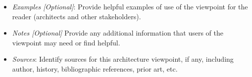 \begin{itemize}
\item {\em Examples [Optional]}: 
Provide helpful examples of use of the viewpoint for the reader
(architects and other stakeholders).
\item {\em Notes [Optional]} Provide any additional information that users of the viewpoint may
need or find helpful.
\item {\em Sources}: Identify sources for this architecture viewpoint, if any,
  including author, history, bibliographic references, prior art, etc.
\end{itemize}


